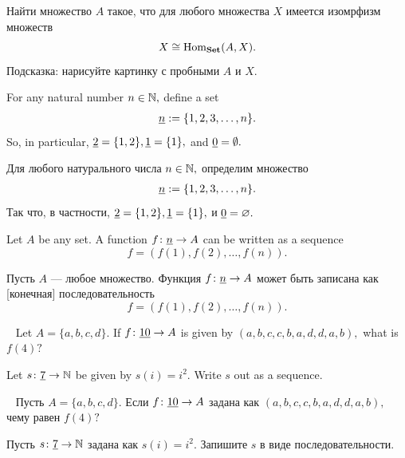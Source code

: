 \documentclass[CT4S-EN-RU]{subfiles}
\begin{document}
\begin{exerciseRUS}\label{exc:generator for set}
Найти множество $A$ такое, что для любого множества $X$ имеется изомрфизм множеств $$X\cong\textnormal{Hom}_{\mathbf{Set}}(A,X).$$ Подсказка: нарисуйте картинку с пробными $A$ и $X.$
\end{exerciseRUS}

\begin{blockENG}
For any natural number $n\in{\mathbb N},$ define a set 
\begin{align}\label{dia:underline n}\index{a symbol!$\ul{n}$}
\ul{n}:=\{1,2,3,\ldots,n\}.
\end{align}
So, in particular, $\underline{2}=\{1,2\}, \underline{1}=\{1\},$ and $\underline{0}=\emptyset.$ 
\end{blockENG}

\begin{blockRUS}
Для любого натурального числа $n\in{\mathbb N},$ определим множество 
\begin{align}\label{dia:underline n}\index{символ!$\ul{n}$}
\ul{n}:=\{1,2,3,\ldots,n\}.
\end{align}
Так что, в частности, $\underline{2}=\{1,2\}, \underline{1}=\{1\},$ и $\underline{0}=\varnothing.$ 
\end{blockRUS}

\begin{blockENG}
Let $A$ be any set. A function $f\colon\underline{n}\rightarrow A$ can be written as a sequence $$f=(f(1),f(2),\ldots,f(n)).$$
\end{blockENG}

\begin{blockRUS}
Пусть $A$ — любое множество. Функция $f\colon\underline{n}\rightarrow A$ может быть записана как [конечная] последовательность $$f=(f(1),f(2),\ldots,f(n)).$$
\end{blockRUS}

\begin{exerciseENG}\label{exc:sequence}~
\sexc Let $A=\{a,b,c,d\}.$ If $f\colon\underline{10}\rightarrow A$ is given by $(a,b,c,c,b,a,d,d,a,b),$ what is $f(4)?$
\item Let $s\colon\underline{7}\rightarrow{\mathbb N}$ be given by $s(i)=i^2.$ Write $s$ out as a sequence.
\endsexc
\end{exerciseENG}

\begin{exerciseRUS}\label{exc:sequence}~
 \sexc Пусть $A=\{a,b,c,d\}.$ Если $f\colon\underline{10}\rightarrow A$ задана как $(a,b,c,c,b,a,d,d,a,b),$ чему равен $f(4)?$
\item Пусть $s\colon\underline{7}\rightarrow{\mathbb N}$ задана как $s(i)=i^2.$ Запишите $s$ в виде последовательности.
\endsexc
\end{exerciseRUS}
\end{document}
